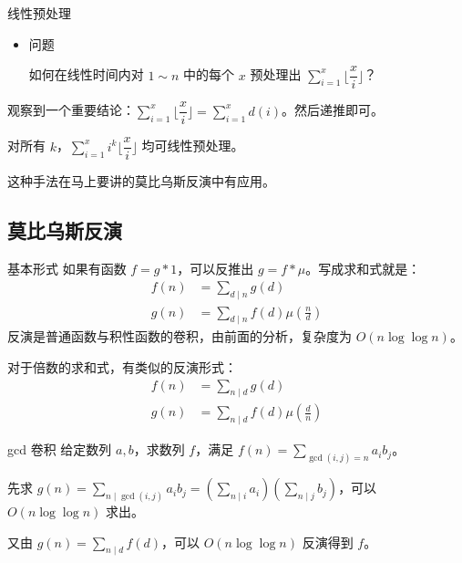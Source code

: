 \documentclass [hyperref={bookmarksdepth=4}, aspectratio=169] {beamer}
\theoremstyle {fy}
\begin{document}
\begin{frame}{线性预处理}
\begin{itemize}
    \item 问题

  如何在线性时间内对 $1\sim n$ 中的每个 $x$ 预处理出 $\sum\limits_{i=1}^x\lfloor\dfrac{x}{i}\rfloor$？
\end{itemize}

观察到一个重要结论：$\sum\limits_{i=1}^x\lfloor\dfrac{x}{i}\rfloor=\sum\limits_{i=1}^xd(i)$。然后递推即可。

对所有 $k$，$\sum\limits_{i=1}^xi^k\lfloor\dfrac{x}{i}\rfloor$ 均可线性预处理。

这种手法在马上要讲的莫比乌斯反演中有应用。
\end{frame}

\subsection{莫比乌斯反演}

\begin{frame}{基本形式}
如果有函数 $f=g*1$，可以反推出 $g=f*\mu$。写成求和式就是：
$$
\begin{aligned}
f(n)&=\sum_{d\mid n} g(d)\\
g(n)&=\sum_{d\mid n} f(d)\mu(\frac{n}{d})
\end{aligned}
$$
反演是普通函数与积性函数的卷积，由前面的分析，复杂度为 $O(n\log\log n)$。

对于倍数的求和式，有类似的反演形式：
$$
\begin{aligned}
f(n)&=\sum_{n\mid d}g(d)\\
g(n)&=\sum_{n\mid d} f(d)\mu(\frac{d}{n})
\end{aligned}
$$
\end{frame}

\begin{frame}{gcd 卷积}
给定数列 $a,b$，求数列 $f$，满足 $f(n)=\sum\limits_{\gcd(i,j)=n}a_ib_j$。

先求 $g(n)=\sum\limits_{n\mid \gcd(i,j)}a_ib_j=(\sum\limits_{n\mid i}a_i)(\sum\limits_{n\mid j}b_j)$，可以 $O(n\log\log n)$ 求出。

又由 $g(n)=\sum\limits_{n\mid d}f(d)$，可以 $O(n\log\log n)$ 反演得到 $f$。
\end{frame}
\end{document}
